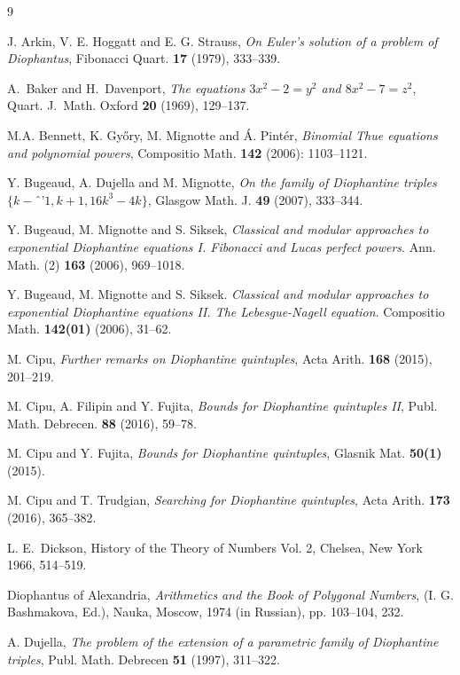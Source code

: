 \documentclass{amsart}
\theoremstyle{definition}
\begin{document}
\begin{thebibliography}{9}

 J. Arkin, V. E. Hoggatt and E. G. Strauss, \emph{On Euler's solution of a problem of Diophantus}, Fibonacci Quart. \textbf{17} (1979), 333--339.

 A.~Baker and H.~Davenport, \emph{The equations {$3x^2-2=y^2$} and {$8x^2-7=z^2$}}, Quart. J.~Math. Oxford \textbf{20} (1969), 129--137.

  M.A. Bennett, K. Gy\H{o}ry, M. Mignotte and \'{A}. Pint\'{e}r, \emph{Binomial Thue equations and polynomial powers}, Compositio Math. \textbf{142}  (2006): 1103--1121.

  Y. Bugeaud, A. Dujella and M. Mignotte, \emph{On the family of Diophantine triples $\{k-1, k+1, 16k^3 - 4k\}$}, Glasgow Math. J. \textbf{49} (2007), 333--344.

 Y. Bugeaud, M. Mignotte and S. Siksek, \emph{Classical and modular approaches to exponential Diophantine equations I. Fibonacci and Lucas perfect powers}. Ann. Math. (2) \textbf{163} (2006), 969--1018.

  Y. Bugeaud, M. Mignotte and S. Siksek. \emph{Classical and modular approaches to exponential Diophantine equations II. The Lebesgue-Nagell equation}. Compositio Math. \textbf{142(01)} (2006), 31--62.

 M. Cipu, \emph{Further remarks on Diophantine quintuples}, Acta Arith. \textbf{168} (2015), 201--219.

 M. Cipu, A. Filipin and Y. Fujita, \emph{Bounds for Diophantine quintuples II}, Publ. Math. Debrecen. \textbf{88} (2016), 59--78. 

 M. Cipu and Y. Fujita, \emph{Bounds for Diophantine quintuples}, Glasnik Mat.  \textbf{50(1)} (2015).

 M. Cipu and T. Trudgian, \emph {Searching for Diophantine quintuples}, Acta Arith. \textbf{173} (2016), 365--382.

 {L. E.~Dickson}, History of the Theory of Numbers Vol. 2, Chelsea, New York 1966, 514--519.

 Diophantus of Alexandria,  \emph{Arithmetics and the Book of Polygonal Numbers}, (I. G. Bashmakova, Ed.), Nauka, Moscow, 1974 (in Russian), pp. 103--104, 232.
 
 A. Dujella, \emph{The problem of the extension of a parametric family of Diophantine triples}, Publ. Math. Debrecen \textbf{51} (1997), 311--322.


\end{thebibliography}
\end{document}
